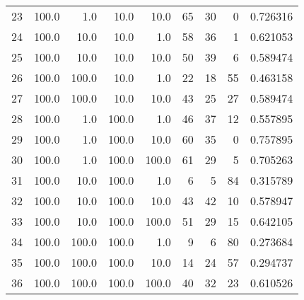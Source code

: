 \begin{tabular}{lrrrrrrrr}
23 &  100.0 &    1.0 &   10.0 &   10.0 &  65 &  30 &   0 &  0.726316 \\
24 &  100.0 &   10.0 &   10.0 &    1.0 &  58 &  36 &   1 &  0.621053 \\
25 &  100.0 &   10.0 &   10.0 &   10.0 &  50 &  39 &   6 &  0.589474 \\
26 &  100.0 &  100.0 &   10.0 &    1.0 &  22 &  18 &  55 &  0.463158 \\
27 &  100.0 &  100.0 &   10.0 &   10.0 &  43 &  25 &  27 &  0.589474 \\
28 &  100.0 &    1.0 &  100.0 &    1.0 &  46 &  37 &  12 &  0.557895 \\
29 &  100.0 &    1.0 &  100.0 &   10.0 &  60 &  35 &   0 &  0.757895 \\
30 &  100.0 &    1.0 &  100.0 &  100.0 &  61 &  29 &   5 &  0.705263 \\
31 &  100.0 &   10.0 &  100.0 &    1.0 &   6 &   5 &  84 &  0.315789 \\
32 &  100.0 &   10.0 &  100.0 &   10.0 &  43 &  42 &  10 &  0.578947 \\
33 &  100.0 &   10.0 &  100.0 &  100.0 &  51 &  29 &  15 &  0.642105 \\
34 &  100.0 &  100.0 &  100.0 &    1.0 &   9 &   6 &  80 &  0.273684 \\
35 &  100.0 &  100.0 &  100.0 &   10.0 &  14 &  24 &  57 &  0.294737 \\
36 &  100.0 &  100.0 &  100.0 &  100.0 &  40 &  32 &  23 &  0.610526 \\
\bottomrule
\end{tabular}
